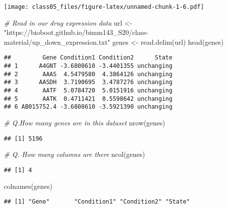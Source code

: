 \documentclass[
]{article}
\newenvironment{Shaded}{\begin{snugshade}}{\end{snugshade}}
\newcommand{\CommentTok}[1]{\textcolor[rgb]{0.56,0.35,0.01}{\textit{#1}}}
\newcommand{\FunctionTok}[1]{\textcolor[rgb]{0.00,0.00,0.00}{#1}}
\newcommand{\NormalTok}[1]{#1}
\newcommand{\OtherTok}[1]{\textcolor[rgb]{0.56,0.35,0.01}{#1}}
\newcommand{\StringTok}[1]{\textcolor[rgb]{0.31,0.60,0.02}{#1}}
\begin{document}
\texttt{[image: class05\_files/figure-latex/unnamed-chunk-1-6.pdf]}

\begin{Shaded}
\begin{Highlighting}[]
\CommentTok{\# Read in our drug expression data}
\NormalTok{url }\OtherTok{\textless{}{-}} \StringTok{"https://bioboot.github.io/bimm143\_S20/class{-}material/up\_down\_expression.txt"}
\NormalTok{genes }\OtherTok{\textless{}{-}} \FunctionTok{read.delim}\NormalTok{(url)}
\FunctionTok{head}\NormalTok{(genes)}
\end{Highlighting}
\end{Shaded}

\begin{verbatim}
##         Gene Condition1 Condition2      State
## 1      A4GNT -3.6808610 -3.4401355 unchanging
## 2       AAAS  4.5479580  4.3864126 unchanging
## 3      AASDH  3.7190695  3.4787276 unchanging
## 4       AATF  5.0784720  5.0151916 unchanging
## 5       AATK  0.4711421  0.5598642 unchanging
## 6 AB015752.4 -3.6808610 -3.5921390 unchanging
\end{verbatim}

\begin{Shaded}
\begin{Highlighting}[]
\CommentTok{\# Q.How many genes are in this dataset}
\FunctionTok{nrow}\NormalTok{(genes)}
\end{Highlighting}
\end{Shaded}

\begin{verbatim}
## [1] 5196
\end{verbatim}

\begin{Shaded}
\begin{Highlighting}[]
\CommentTok{\# Q. How many columns are there}
\FunctionTok{ncol}\NormalTok{(genes)}
\end{Highlighting}
\end{Shaded}

\begin{verbatim}
## [1] 4
\end{verbatim}

\begin{Shaded}
\begin{Highlighting}[]
\FunctionTok{colnames}\NormalTok{(genes)}
\end{Highlighting}
\end{Shaded}

\begin{verbatim}
## [1] "Gene"       "Condition1" "Condition2" "State"
\end{verbatim}
\end{document}
